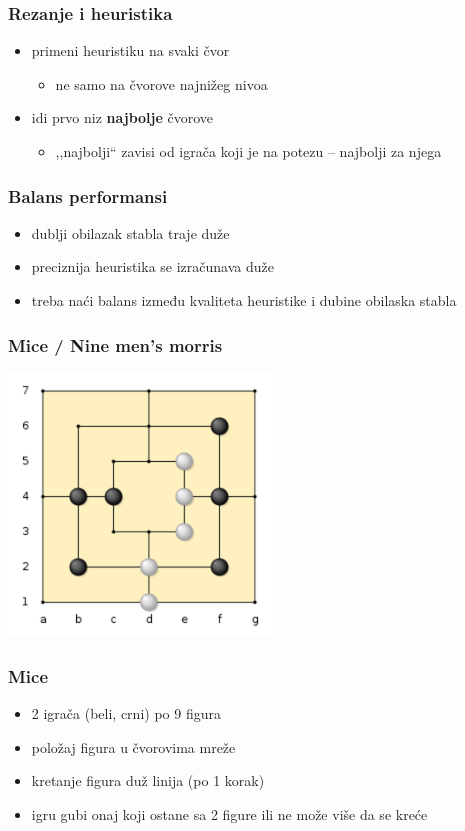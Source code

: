 \documentclass[compress,aspectratio=169]{beamer}
\begin{document}
\begin{frame}[fragile]
  \frametitle{Rezanje i heuristika}
  \begin{itemize}
    \item primeni heuristiku na svaki čvor
    \begin{itemize}
      \item ne samo na čvorove najnižeg nivoa
    \end{itemize}
    \item idi prvo niz \textbf{najbolje} čvorove
    \begin{itemize}
      \item ,,najbolji`` zavisi od igrača koji je na potezu -- najbolji za njega
    \end{itemize}
  \end{itemize}
\end{frame}

\begin{frame}[fragile]
  \frametitle{Balans performansi}
  \begin{itemize}
    \item dublji obilazak stabla traje duže
    \item preciznija heuristika se izračunava duže
    \item treba naći balans između kvaliteta heuristike i dubine obilaska stabla
  \end{itemize}
\end{frame}

\begin{frame}[fragile]
  \frametitle{Mice / Nine men's morris}
  \begin{center}
    \includegraphics[width=7cm]{prj-01-pic13.png}
  \end{center}
\end{frame}

\begin{frame}[fragile]
  \frametitle{Mice}
  \begin{itemize}
    \item 2 igrača (beli, crni) po 9 figura
    \item položaj figura u čvorovima mreže
    \item kretanje figura duž linija (po 1 korak)
    \item igru gubi onaj koji ostane sa 2 figure ili ne može više da se kreće
  \end{itemize}
\end{frame}
\end{document}
